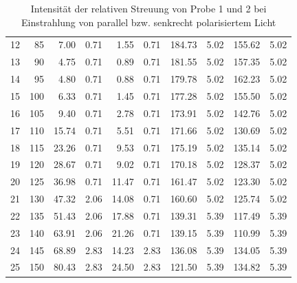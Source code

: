 \begin{table}[ht]
\begin{tabular}{lrrrrrrrrr}
    12 &        85 &          7.00 &            0.71 &          1.55 &            0.71 &        184.73 &            5.02 &        155.62 &            5.02 \\
    13 &        90 &          4.75 &            0.71 &          0.89 &            0.71 &        181.55 &            5.02 &        157.35 &            5.02 \\
    14 &        95 &          4.80 &            0.71 &          0.88 &            0.71 &        179.78 &            5.02 &        162.23 &            5.02 \\
    15 &       100 &          6.33 &            0.71 &          1.45 &            0.71 &        177.28 &            5.02 &        155.50 &            5.02 \\
    16 &       105 &          9.40 &            0.71 &          2.78 &            0.71 &        173.91 &            5.02 &        142.76 &            5.02 \\
    17 &       110 &         15.74 &            0.71 &          5.51 &            0.71 &        171.66 &            5.02 &        130.69 &            5.02 \\
    18 &       115 &         23.26 &            0.71 &          9.53 &            0.71 &        175.19 &            5.02 &        135.14 &            5.02 \\
    19 &       120 &         28.67 &            0.71 &          9.02 &            0.71 &        170.18 &            5.02 &        128.37 &            5.02 \\
    20 &       125 &         36.98 &            0.71 &         11.47 &            0.71 &        161.47 &            5.02 &        123.30 &            5.02 \\
    21 &       130 &         47.32 &            2.06 &         14.08 &            0.71 &        160.60 &            5.02 &        125.74 &            5.02 \\
    22 &       135 &         51.43 &            2.06 &         17.88 &            0.71 &        139.31 &            5.39 &        117.49 &            5.39 \\
    23 &       140 &         63.91 &            2.06 &         21.26 &            0.71 &        139.15 &            5.39 &        110.99 &            5.39 \\
    24 &       145 &         68.89 &            2.83 &         14.23 &            2.83 &        136.08 &            5.39 &        134.05 &            5.39 \\
    25 &       150 &         80.43 &            2.83 &         24.50 &            2.83 &        121.50 &            5.39 &        134.82 &            5.39 \\
        \bottomrule
    \end{tabular}

    \caption{Intensität der relativen Streuung von Probe 1 und 2 bei Einstrahlung von parallel bzw. senkrecht polarisiertem Licht}
    \label{Streuparameter}
\end{table}

